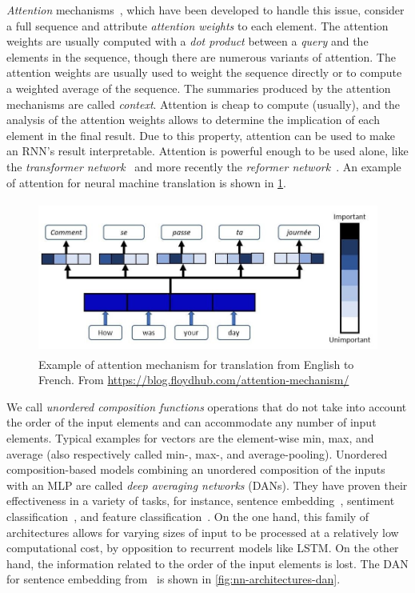 \textit{Attention} mechanisms~\cite{attention:2015:bahdanau}, which have been developed to handle this issue, consider a full sequence and attribute \textit{attention weights} to each element. The attention weights are usually computed with a \textit{dot product} between a \textit{query} and the elements in the sequence, though there are numerous variants of attention. The attention weights are usually used to weight the sequence directly or to compute a weighted average of the sequence.
The summaries produced by the attention mechanisms are called \textit{context}.
Attention is cheap to compute (usually), and the analysis of the attention weights allows to determine the implication of each element in the final result.
Due to this property, attention can be used to make an RNN's result interpretable.
Attention is powerful enough to be used alone, like the \textit{transformer network}~\cite{transformer:2017:vaswani} and more recently the \textit{reformer network}~\cite{reformer:2020:kitaev}.
An example of attention for neural machine translation is shown in \cref{fig:nn-architectures-attention}.

\begin{figure}
    \centering
    \includegraphics[keepaspectratio, width=.9\textwidth, height=5cm]{Figures/Ch0/attention.jpg}
    \caption{Example of attention mechanism for translation from English to French. From \footnotesize{\url{https://blog.floydhub.com/attention-mechanism/}}}
    \label{fig:nn-architectures-attention}
\end{figure}

We call \textit{unordered composition functions} operations that do not take into account the order of the input elements and can accommodate any number of input elements. Typical examples for vectors are the element-wise min, max, and average (also respectively called min-, max-, and average-pooling).
Unordered composition-based models combining an unordered composition of the inputs with an MLP are called \textit{deep averaging networks} (DANs).
They have proven their effectiveness in a variety of tasks, for instance, sentence embedding~\cite{dan:2015:iyyer}, sentiment classification~\cite{adan:2016:chen}, and feature classification~\cite{cdan:2017:gardner}.
On the one hand, this family of architectures allows for varying sizes of input to be processed at a relatively low computational cost, by opposition to recurrent models like LSTM.
On the other hand, the information related to the order of the input elements is lost.
The DAN for sentence embedding from~\cite{dan:2015:iyyer} is shown in \cref{fig:nn-architectures-dan}.

